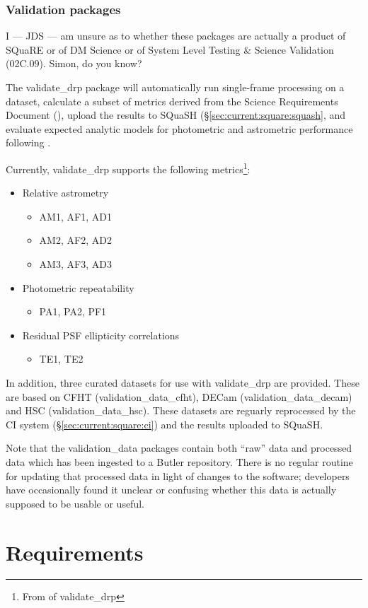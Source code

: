 \documentclass[DM,authoryear,toc,lsstdraft]{lsstdoc}
\begin{document}
\subsubsection{Validation packages}
\label{sec:current:square:validate}

\begin{draftnote}
I --- JDS --- am unsure as to whether these packages are actually a product of
SQuaRE or of DM Science or of System Level Testing \& Science Validation
(02C.09). Simon, do you know?
\end{draftnote}

The validate\_drp package will automatically run single-frame processing on a
dataset, calculate a subset of metrics derived from the Science Requirements
Document (), upload the results to SQuaSH
(\S\ref{sec:current:square:squash}, and evaluate expected analytic models for
photometric and astrometric performance following \cite{2008arXiv0805.2366I}.

Currently, validate\_drp supports the following metrics\footnote{From
 of validate\_drp }:

\begin{itemize}
\item{Relative astrometry
  \begin{itemize}
    \item{AM1, AF1, AD1}
    \item{AM2, AF2, AD2}
    \item{AM3, AF3, AD3}
  \end{itemize}
}
\item{Photometric repeatability
  \begin{itemize}
    \item{PA1, PA2, PF1}
  \end{itemize}
}
\item{Residual PSF ellipticity correlations
  \begin{itemize}
    \item{TE1, TE2}
  \end{itemize}
}
\end{itemize}

In addition, three curated datasets for use with validate\_drp are provided.
These are based on CFHT (validation\_data\_cfht), DECam
(validation\_data\_decam) and HSC (validation\_data\_hsc). These datasets are
reguarly reprocessed by the CI system (\S\ref{sec:current:square:ci}) and the
results uploaded to SQuaSH.

Note that the validation\_data packages contain both ``raw'' data and
processed data which has been ingested to a Butler repository. There is no
regular routine for updating that processed data in light of changes to the
software; developers have occasionally found it unclear or confusing whether
this data is actually supposed to be usable or useful.

\section{Requirements}
\label{sec:req}



\end{document}
